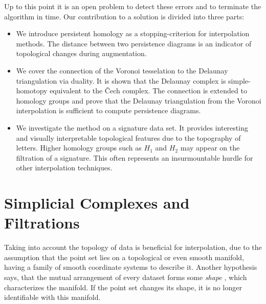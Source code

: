\documentclass{article}
\begin{document}
Up to this point it is an open problem to detect these errors and to terminate the algorithm in time. Our contribution to a solution is divided into three parts:
\begin{itemize}
  \item We introduce persistent homology as a stopping-criterion for interpolation methods. The distance between two persistence diagrams is an indicator of topological changes during augmentation.
  \item We cover the connection of the Voronoi tesselation to the Delaunay triangulation via duality. It is shown that the Delaunay complex is simple-homotopy equivalent to the \v{C}ech complex. The connection is extended to homology groups and prove that the Delaunay triangulation from the Voronoi interpolation is sufficient to compute persistence diagrams.
  \item We investigate the method on a signature data set. It provides interesting and visually interpretable topological features due to the topography of letters. Higher homology groups such as $H_1$ and $H_2$ may appear on the filtration of a signature. This often represents an insurmountable hurdle for other interpolation techniques.
\end{itemize}

\section{Simplicial Complexes and Filtrations}
\label{sec:simplex}
Taking into account the topology of data is beneficial for interpolation, due to the assumption that the point set lies on a topological or even smooth manifold, having a family of smooth coordinate systems to describe it. Another hypothesis says, that the mutual arrangement of every dataset forms some \textit{shape} \cite{ZomorodianC05}, which characterizes the manifold. If the point set changes its shape, it is no longer identifiable with this manifold.
\end{document}
